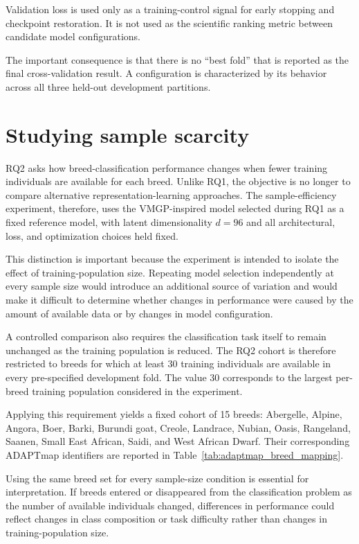 Validation loss is used only as a training-control signal for early
stopping and checkpoint restoration. It is not used as the scientific
ranking metric between candidate model configurations.

The important consequence is that there is no ``best fold'' that is
reported as the final cross-validation result. A configuration is
characterized by its behavior across all three held-out development
partitions.

\section{Studying sample scarcity}
\label{sec:sample_size_protocol}

RQ2 asks how breed-classification performance changes when fewer
training individuals are available for each breed. Unlike RQ1, the
objective is no longer to compare alternative representation-learning
approaches. The sample-efficiency experiment, therefore, uses the
VMGP-inspired model selected during RQ1 as a fixed reference model,
with latent dimensionality $d=96$ and all architectural, loss, and
optimization choices held fixed.

This distinction is important because the experiment is intended to
isolate the effect of training-population size. Repeating model
selection independently at every sample size would introduce an
additional source of variation and would make it difficult to
determine whether changes in performance were caused by the amount of
available data or by changes in model configuration.

A controlled comparison also requires the classification task itself
to remain unchanged as the training population is reduced. The RQ2
cohort is therefore restricted to breeds for which at least $30$
training individuals are available in every pre-specified development
fold. The value $30$ corresponds to the largest per-breed training
population considered in the experiment.

Applying this requirement yields a fixed cohort of 15 breeds:
Abergelle, Alpine, Angora, Boer, Barki, Burundi goat, Creole,
Landrace, Nubian, Oasis, Rangeland, Saanen, Small East African,
Saidi, and West African Dwarf. Their corresponding ADAPTmap
identifiers are reported in
Table~\ref{tab:adaptmap_breed_mapping}.

Using the same breed set for every sample-size condition is essential
for interpretation. If breeds entered or disappeared from the
classification problem as the number of available individuals changed,
differences in performance could reflect changes in class composition
or task difficulty rather than changes in training-population size.

